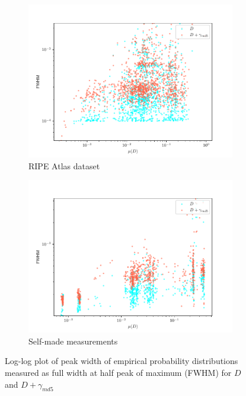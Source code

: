 \documentclass[12pt,a4paper,automark, toc=bib]{scrreprt}
\theoremstyle{definition}
\begin{document}
			\begin{figure}
				\centering
				\begin{subfigure}{0.49\linewidth}
					\includegraphics[width=\linewidth]{figures/stat_md5_0FWHM_logscale.pdf}
					\caption{RIPE Atlas dataset}
				\end{subfigure}
				\begin{subfigure}{0.49\linewidth}
					\includegraphics[width=\linewidth]{figures/stat_md5_00all_FWHM_logscale.pdf}
					\caption{Self-made measurements}
				\end{subfigure}
			\caption{Log-log plot of peak width of empirical probability distributions measured as full width at half peak of maximum (FWHM) for $D$ and $D + \gamma_{md5}$}
			\label{peak-width-fig}
			\end{figure}
			
\end{document}
